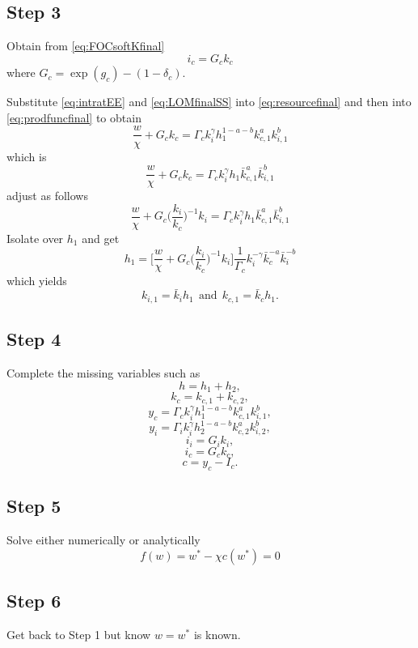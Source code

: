 \documentclass{article}
\begin{document}
\subsection*{Step 3}


Obtain from \ref{eq:FOCsoftKfinal}
\begin{equation}\label{eq:LOMfinalSS}
i_c = G_c k_c
\end{equation}
where $G_c = \exp(g_c) - (1 - \delta_c)$.

Substitute \ref{eq:intratEE} and \ref{eq:LOMfinalSS} into \ref{eq:resourcefinal} and then into \ref{eq:prodfuncfinal} to obtain
$$
\frac{w}{\chi} + G_c k_c = \Gamma_{c} k_{i}^{\gamma} h_{1}^{1 - a- b} k_{c,1}^a k_{i,1}^b
$$
which is
$$
\frac{w}{\chi} + G_c k_c = \Gamma_{c} k_{i}^{\gamma} h_{1} \bar{k}_{c,1}^a \bar{k}_{i,1}^b
$$
adjust as follows
$$
\frac{w}{\chi} + G_c \bigg( \frac{k_i}{k_c} \bigg)^{-1} k_i = \Gamma_{c} k_{i}^{\gamma} h_{1} \bar{k}_{c,1}^a \bar{k}_{i,1}^b
$$
Isolate over $h_1$ and get
\begin{equation}
h_1 = \bigg[   \frac{w}{\chi} + G_c \bigg( \frac{k_i}{k_c} \bigg)^{-1} k_i    \bigg] \frac{1}{\Gamma_c} k_i^{-\gamma} \bar{k}_c^{-a} \bar{k}_i^{-b}
\end{equation}
which yields
$$
k_{i,1} = \bar{k}_i h_1 \ \ \text{and} \ \ k_{c,1} = \bar{k}_c h_1.
$$

\subsection*{Step 4}

Complete the missing variables such as
$$
h = h_1 + h_2,
$$
$$
k_c = k_{c,1} + k_{c,2},
$$
$$
y_c =  \Gamma_c k_i^{\gamma} h_1^{1-a-b} k_{c,1}^{a} k_{i,1}^{b},
$$
$$
y_i =  \Gamma_i k_i^{\gamma} h_2^{1-a-b} k_{c,2}^{a} k_{i,2}^{b},
$$
$$
i_i =  G_i k_{i},
$$
$$
i_c =  G_c k_{c},
$$
$$
c =  y_c - I_c.
$$


\subsection*{Step 5}

Solve either numerically or analytically 
$$
f(w) = w^* - \chi c(w^*) = 0
$$

\subsection*{Step 6}

Get back to Step 1 but know $w = w^*$ is known.
\end{document}
